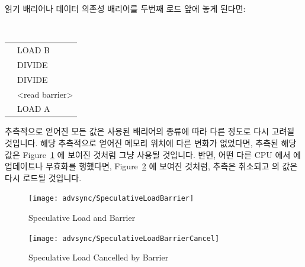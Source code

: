 \begin{enumerate}
읽기 배리어나 데이터 의존성 배리어를 두번째 로드 앞에 놓게 된다면:

\vspace{5pt}
\begin{minipage}[t]{\columnwidth}
\tt
\scriptsize
\begin{tabular}{l|p{1.5in}}
	\nf{CPU 1} &	\nf{CPU 2} \\
	\hline
		&	LOAD B \\
		&	DIVIDE \\
		&	DIVIDE \\
		&	<read barrier> \\
		&	LOAD A \\
\end{tabular}
\vspace{5pt}

\end{minipage}
%
추측적으로 얻어진 모든 값은 사용된 배리어의 종류에 따라 다른 정도로 다시 고려될
것입니다.
해당 추측적으로 얻어진 메모리 위치에 다른 변화가 없었다면, 추측된 해당 값은
Figure~\ref{fig:advsync:Speculative Loads and Barrier} 에 보여진 것처럼 그냥
사용될 것입니다.
반면, 어떤 다른 CPU 에서  에 업데이트나 무효화를 행했다면,
Figure~\ref{fig:advsync:Speculative Loads Cancelled by Barrier} 에 보여진
것처럼, 추측은 취소되고  의 값은 다시 로드될 것입니다.

\begin{figure}[htbp]
\centering
\texttt{[image: advsync/SpeculativeLoadBarrier]}
\caption{Speculative Load and Barrier}
\label{fig:advsync:Speculative Loads and Barrier}
\end{figure}

\begin{figure}[htbp]
\centering
\texttt{[image: advsync/SpeculativeLoadBarrierCancel]}
\caption{Speculative Load Cancelled by Barrier}
\label{fig:advsync:Speculative Loads Cancelled by Barrier}
\end{figure}


\end{enumerate}
